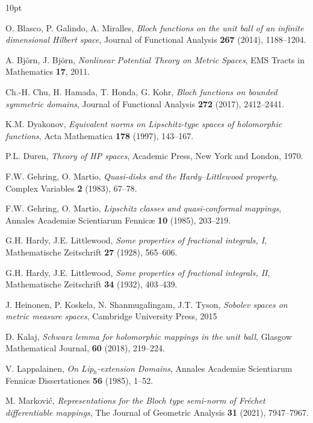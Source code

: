 \documentclass{amsart}
\theoremstyle{definition}
\numberwithin{equation}{section}
\begin{document}
\begin{thebibliography}{10pt}

O. Blasco, P. Galindo, A. Miralles, \textit{Bloch functions on the unit ball of an infinite dimensional Hilbert space},
Journal of Functional Analysis \textbf{267} (2014), 1188--1204.

A. Björn, J. Björn, \textit{Nonlinear Potential Theory on Metric Spaces},
EMS Tracts in Mathematics \textbf{17}, 2011.

Ch.-H. Chu, H. Hamada, T. Honda, G. Kohr, \textit{Bloch functions on bounded symmetric domains},
Journal of Functional Analysis  \textbf{272} (2017), 2412--2441.

K.M. Dyakonov, \textit{Equivalent norms on Lipschitz-type spaces of holomorphic functions},
Acta Mathematica \textbf{178} (1997), 143--167.

P.L. Duren, \textit{Theory of HP spaces}, Academic Press, New York and London, 1970.

F.W. Gehring, O. Martio, \textit{Quasi-disks and the Hardy--Littlewood property},
Complex Variables \textbf{2} (1983), 67--78.

F.W. Gehring,  O. Martio, \textit{Lipschitz classes and quasi-conformal mappings},
Annales Academi{\ae} Scientiarum Fennic{\ae} \textbf{10} (1985), 203--219.

G.H. Hardy,  J.E. Littlewood, \textit{Some properties of fractional integrals, I},
Mathematische Zeitschrift \textbf{27} (1928), 565--606.

G.H. Hardy, J.E. Littlewood, \textit{Some properties of fractional integrals, II},
Mathematische Zeitschrift \textbf{34} (1932), 403--439.

J. Heinonen, P. Koskela, N. Shanmugalingam, J.T. Tyson,
\textit{Sobolev spaces on metric measure spaces}, Cambridge University Press, 2015

D. Kalaj, \textit{Schwarz lemma for holomorphic mappings in the unit ball},
Glasgow Mathematical Journal, \textbf{60} (2018), 219--224.

V. Lappalainen, \textit{On Lip$_h$-extension Domains},
Annales Academi{\ae} Scientiarum Fennic{\ae} Dissertationes \textbf{56} (1985), 1--52.

M. Markovi\'{c}, \textit{Representations for the Bloch type semi-norm of Fr\'{e}chet differentiable mappings},
The Journal of Geometric Analysis \textbf{31} (2021), 7947--7967.


\end{thebibliography}
\end{document}
